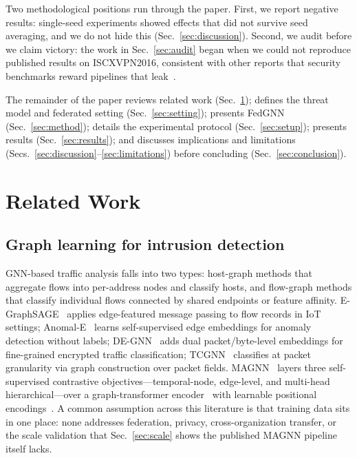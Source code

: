 \documentclass[journal]{IEEEtran}
\begin{document}
Two methodological positions run through the paper. First, we report
negative results: single-seed experiments showed effects that did not
survive seed averaging, and we do not hide this
(Sec.~\ref{sec:discussion}). Second, we audit before we claim victory:
the work in Sec.~\ref{sec:audit} began when we could not reproduce
published results on ISCXVPN2016, consistent with other reports that
security benchmarks reward pipelines that leak~\cite{arp,engelen}.

The remainder of the paper reviews related work
(Sec.~\ref{sec:related}); defines the threat model and federated
setting (Sec.~\ref{sec:setting}); presents FedGNN
(Sec.~\ref{sec:method}); details the experimental protocol
(Sec.~\ref{sec:setup}); presents results
(Sec.~\ref{sec:results}); and discusses implications and limitations
(Secs.~\ref{sec:discussion}--\ref{sec:limitations}) before concluding
(Sec.~\ref{sec:conclusion}).

\section{Related Work}
\label{sec:related}

\subsection{Graph learning for intrusion detection}
GNN-based traffic analysis falls into two types: host-graph methods
that aggregate flows into per-address nodes and classify hosts, and
flow-graph methods that classify individual flows connected by shared
endpoints or feature affinity. E-GraphSAGE~\cite{egraphsage} applies
edge-featured message passing to flow records in IoT settings;
Anomal-E~\cite{anomale} learns self-supervised edge embeddings for
anomaly detection without labels; DE-GNN~\cite{degnn} adds dual
packet/byte-level embeddings for fine-grained encrypted traffic
classification; TCGNN~\cite{tcgnn} classifies at packet granularity
via graph construction over packet fields. MAGNN~\cite{magnn} layers
three self-supervised contrastive objectives---temporal-node,
edge-level, and multi-head hierarchical---over a graph-transformer
encoder~\cite{transformerconv} with learnable positional
encodings~\cite{rwse}. A common assumption across this literature is
that training data sits in one place: none addresses federation,
privacy, cross-organization transfer, or the scale validation that
Sec.~\ref{sec:scale} shows the published MAGNN pipeline itself lacks.
\end{document}

